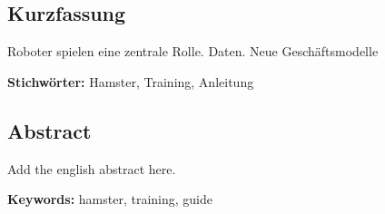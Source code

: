 \cleardoublepage

\begin{otherlanguage}{ngerman}
\chapter*{Kurzfassung}

Roboter spielen eine zentrale Rolle. Daten. Neue Geschäftsmodelle

\vfill
\noindent\textbf{Stichwörter:} Hamster, Training, Anleitung
\vfill
\end{otherlanguage}
\begin{otherlanguage}{english}
\chapter*{Abstract}

Add the english abstract here.

\vfill
\noindent\textbf{Keywords:} hamster, training, guide
\vfill
\end{otherlanguage}
